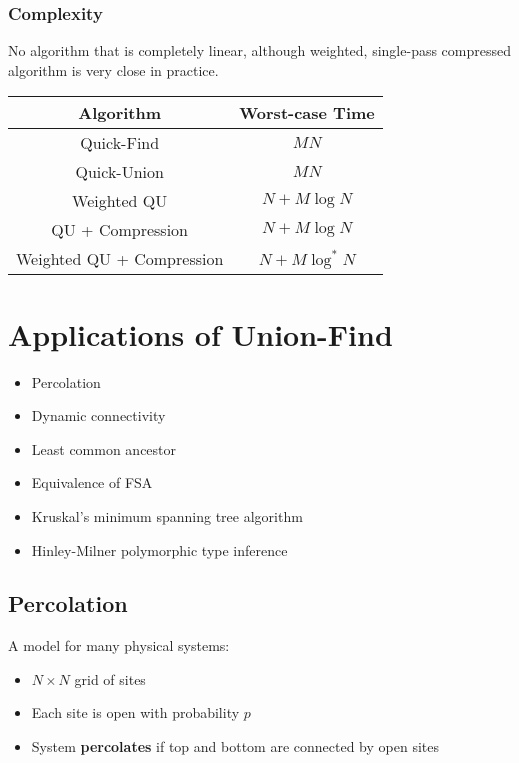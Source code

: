 \documentclass[11pt]{article}
\begin{document}
		\subsubsection{Complexity}
			No algorithm that is completely linear, although weighted, single-pass compressed algorithm is very close in practice.
			
			\begin{center}\begin{tabular}[t]{c c}
			\hline
			\textbf{Algorithm}	&	\textbf{Worst-case Time}	\\\hline
			Quick-Find	&	$MN$	\\
			Quick-Union	&	$MN$	\\\hline
			Weighted QU	&	$N+M\log N$	\\
			QU + Compression	&	$N + M\log N$	\\
			Weighted QU + Compression	&	$N+M\log^* N$\\\hline
			\end{tabular}\end{center}
			
\section{Applications of Union-Find}
	\begin{itemize}
		\item Percolation
		\item Dynamic connectivity
		\item Least common ancestor
		\item Equivalence of FSA
		\item Kruskal's minimum spanning tree algorithm
		\item Hinley-Milner polymorphic type inference
	\end{itemize}
	
	\subsection{Percolation}
		A model for many physical systems:
		\begin{itemize}
			\item $N\times N$ grid of sites
			\item Each site is open with probability $p$
			\item System \textbf{percolates} if top and bottom are connected by open sites
		\end{itemize}
		
\end{document}
